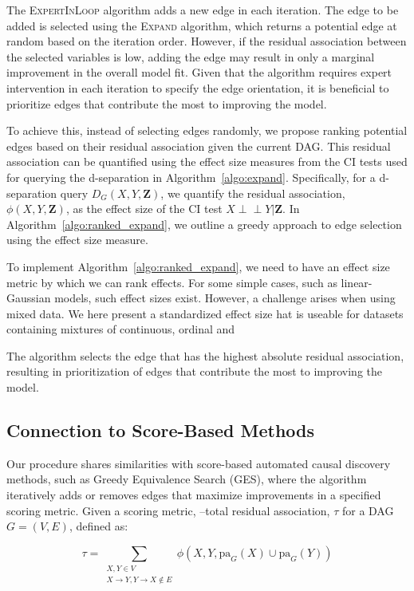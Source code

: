\documentclass{uai2025} %
\def\ci{\perp\!\!\!\!\!\perp}
\begin{document}
The \textsc{ExpertInLoop} algorithm adds a new edge in each iteration. The edge
to be added is selected using the \textsc{Expand} algorithm, which returns a
potential edge at random based on the iteration order. However, if the residual
association between the selected variables is low, adding the edge may result
in only a marginal improvement in the overall model fit. Given that the
algorithm requires expert intervention in each iteration to specify the edge
orientation, it is beneficial to prioritize edges that contribute the most to
improving the model.

To achieve this, instead of selecting edges randomly, we propose ranking
potential edges based on their residual association given the current DAG. This
residual association can be quantified using the effect size measures from the
CI tests used for querying the d-separation in Algorithm~\ref{algo:expand}.
Specifically, for a d-separation query $ D_G(X, Y, \mathbf{Z}) $, we quantify
the residual association, $ \phi(X, Y, \bm{Z}) $, as the effect size of the CI
test $ X \ci Y \rvert \bm{Z} $. In Algorithm~\ref{algo:ranked_expand}, we
outline a greedy approach to edge selection using the effect size measure. 

To implement Algorithm~\ref{algo:ranked_expand}, we need to have an effect size 
metric by which we can rank effects. For some simple cases, such as 
linear-Gaussian models, such effect sizes exist. However, a challenge arises
when using mixed data. We here present a standardized effect size hat 
is useable for datasets containing mixtures of continuous, ordinal and 

The
algorithm selects the edge that has the highest absolute residual association,
resulting in prioritization of edges that contribute the most to improving the
model.


\subsection{Connection to Score-Based Methods}


Our procedure shares similarities with score-based automated causal discovery
methods, such as Greedy Equivalence Search (GES), where the algorithm
iteratively adds or removes edges that maximize improvements in a specified
scoring metric. Given a scoring metric, --total residual association, $ \tau $ for 
a DAG $ G = (V, E) $, defined as:

\begin{equation}
	\tau = \sum_{\substack{X, Y \in V \\ X \rightarrow Y, Y \rightarrow X \not \in E}}   \phi(X, Y, \mathrm{pa}_G(X) \cup \mathrm{pa}_G(Y))
\end{equation}
\end{document}
